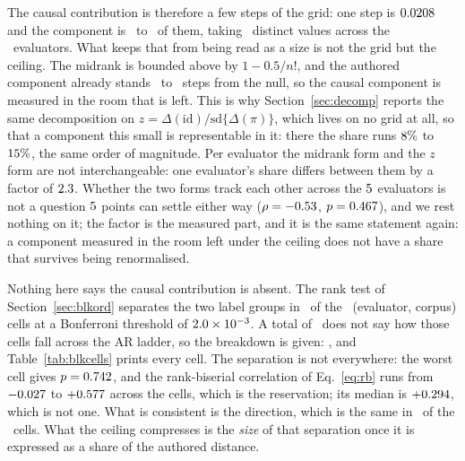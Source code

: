 The causal contribution is therefore a few steps of the grid: one step is
$0.0208$ and the component is \CausalCompStepsMin\ to
\CausalCompStepsMax\ of them, taking \CausalCompNDistinct\ distinct
values across the \TrendNEval\ evaluators.  What keeps that from being
read as a size is not the grid but the ceiling.  The midrank is bounded
above by $1 - 0.5/n!$, and the authored component already stands
\AuthoredCompStepsMin\ to \AuthoredCompStepsMax\ steps from the null, so
the causal component is measured in the room that is left.
This is why Section~\ref{sec:decomp}
reports the same decomposition on
$z = \Delta(\mathrm{id})/\mathrm{sd}\{\Delta(\pi)\}$, which lives on no
grid at all, so that a component this small is representable in it: there
the share runs $8\%$ to $15\%$, the same order of
magnitude.  Per evaluator the midrank form and the $z$ form are not
interchangeable: one evaluator's share differs between them by a factor of
$2.3$.  Whether the two forms track each other across the
$5$ evaluators is not a question $5$ points can
settle either way ($\rho = -0.53$, $p = 0.467$), and we rest
nothing on it; the factor is the measured part, and it is the same statement again: a component measured
in the room left under the ceiling does not have a share that survives
being renormalised.

Nothing here says the causal contribution is absent.  The rank test of
Section~\ref{sec:blkord} separates the two label groups in
\ContrastNRejecting\ of the \ContrastNCells\ (evaluator, corpus) cells at a
Bonferroni threshold of $2.0\times10^{-3}$.  A total of \ContrastNRejecting\ does not say how those cells fall across
the AR ladder, so the breakdown is given: \ContrastRejectByEval, and
Table~\ref{tab:blkcells} prints every cell.  The separation is not
everywhere: the worst cell gives $p = 0.742$, and the
rank-biserial correlation of Eq.~\eqref{eq:rb} runs from $-0.027$ to
$+0.577$ across the cells, which is the reservation; its median is
$+0.294$, which is not one.  What is consistent is the direction,
which is the same in \ContrastNPositive\ of the \ContrastNCells\ cells.
What the ceiling compresses is the \emph{size} of that separation once it is
expressed as a share of the authored distance.

